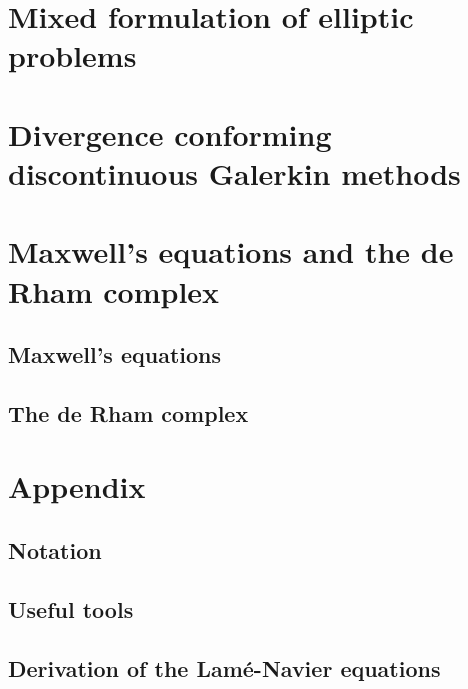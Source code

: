 \chapter{Mixed formulation of elliptic problems}
\label{cha:darcy}


\chapter{Divergence conforming discontinuous Galerkin methods}
\label{cha:hdivdg}


\chapter{Maxwell's equations and the de Rham complex}
\section{Maxwell's equations}
\label{cha:maxwell}


\section{The de Rham complex}
\label{cha:derham}


% 
% 

\appendix
\chapter{Appendix}
\section{Notation}



\section{Useful tools}


\section{Derivation of the Lamé-Navier equations}
\label{sec:lame-navier}




\printindex


